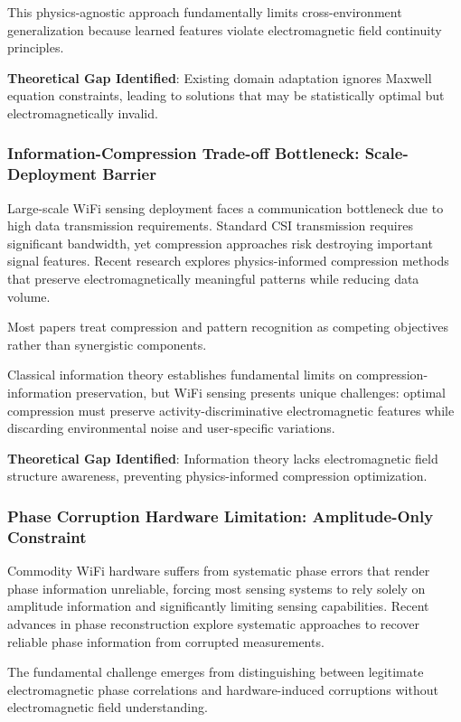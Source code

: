 \documentclass[journal]{IEEEtran}
\begin{document}
This physics-agnostic approach fundamentally limits cross-environment generalization because learned features violate electromagnetic field continuity principles.

\textbf{Theoretical Gap Identified}: Existing domain adaptation ignores Maxwell equation constraints, leading to solutions that may be statistically optimal but electromagnetically invalid.

\subsubsection{Information-Compression Trade-off Bottleneck: Scale-Deployment Barrier}

Large-scale WiFi sensing deployment faces a communication bottleneck due to high data transmission requirements. Standard CSI transmission requires significant bandwidth, yet compression approaches risk destroying important signal features. Recent research explores physics-informed compression methods that preserve electromagnetically meaningful patterns while reducing data volume.

Most papers treat compression and pattern recognition as competing objectives rather than synergistic components.

Classical information theory \cite{cover1999elements} establishes fundamental limits on compression-information preservation, but WiFi sensing presents unique challenges: optimal compression must preserve activity-discriminative electromagnetic features while discarding environmental noise and user-specific variations.

\textbf{Theoretical Gap Identified}: Information theory lacks electromagnetic field structure awareness, preventing physics-informed compression optimization.

\subsubsection{Phase Corruption Hardware Limitation: Amplitude-Only Constraint}

Commodity WiFi hardware suffers from systematic phase errors that render phase information unreliable, forcing most sensing systems to rely solely on amplitude information and significantly limiting sensing capabilities. Recent advances in phase reconstruction explore systematic approaches to recover reliable phase information from corrupted measurements.

The fundamental challenge emerges from distinguishing between legitimate electromagnetic phase correlations and hardware-induced corruptions without electromagnetic field understanding.
\end{document}
